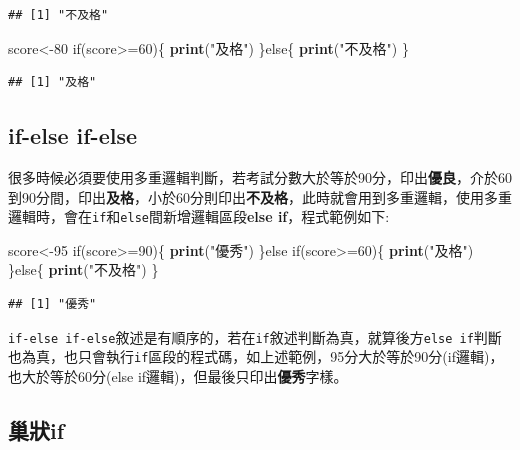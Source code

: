 \documentclass[]{book}
\newenvironment{Shaded}{\begin{snugshade}}{\end{snugshade}}
\newcommand{\KeywordTok}[1]{\textcolor[rgb]{0.13,0.29,0.53}{\textbf{{#1}}}}
\newcommand{\DecValTok}[1]{\textcolor[rgb]{0.00,0.00,0.81}{{#1}}}
\newcommand{\StringTok}[1]{\textcolor[rgb]{0.31,0.60,0.02}{{#1}}}
\newcommand{\NormalTok}[1]{{#1}}
\theoremstyle{definition}
\theoremstyle{definition}
\theoremstyle{remark}
\begin{document}
\begin{verbatim}
## [1] "不及格"
\end{verbatim}

\begin{Shaded}
\begin{Highlighting}[]
\NormalTok{score<-}\DecValTok{80}
\NormalTok{if(score>=}\DecValTok{60}\NormalTok{)\{}
  \KeywordTok{print}\NormalTok{(}\StringTok{"及格"}\NormalTok{)}
\NormalTok{\}else\{}
  \KeywordTok{print}\NormalTok{(}\StringTok{"不及格"}\NormalTok{)}
\NormalTok{\}}
\end{Highlighting}
\end{Shaded}

\begin{verbatim}
## [1] "及格"
\end{verbatim}

\subsection{if-else if-else}\label{if-else-if-else}

很多時候必須要使用多重邏輯判斷，若考試分數大於等於90分，印出\textbf{優良}，介於60到90分間，印出\textbf{及格}，小於60分則印出\textbf{不及格}，此時就會用到多重邏輯，使用多重邏輯時，會在\texttt{if}和\texttt{else}間新增邏輯區段\textbf{else
if}，程式範例如下:

\begin{Shaded}
\begin{Highlighting}[]
\NormalTok{score<-}\DecValTok{95}
\NormalTok{if(score>=}\DecValTok{90}\NormalTok{)\{}
  \KeywordTok{print}\NormalTok{(}\StringTok{"優秀"}\NormalTok{)}
\NormalTok{\}else if(score>=}\DecValTok{60}\NormalTok{)\{}
  \KeywordTok{print}\NormalTok{(}\StringTok{"及格"}\NormalTok{)}
\NormalTok{\}else\{}
  \KeywordTok{print}\NormalTok{(}\StringTok{"不及格"}\NormalTok{)}
\NormalTok{\}}
\end{Highlighting}
\end{Shaded}

\begin{verbatim}
## [1] "優秀"
\end{verbatim}

\texttt{if-else\ if-else}敘述是有順序的，若在\texttt{if}敘述判斷為真，就算後方\texttt{else\ if}判斷也為真，也只會執行\texttt{if}區段的程式碼，如上述範例，95分大於等於90分(if邏輯)，也大於等於60分(else
if邏輯)，但最後只印出\textbf{優秀}字樣。

\subsection{巢狀if}\label{if}
\end{document}
